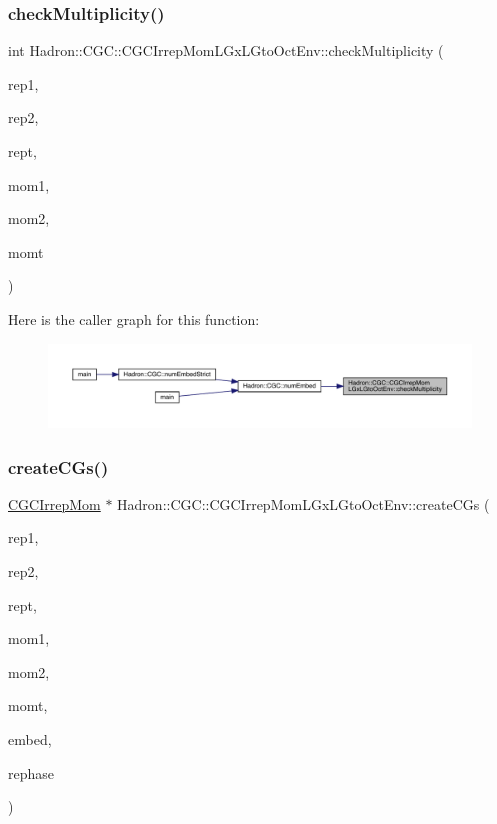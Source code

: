 \subsubsection{\texorpdfstring{checkMultiplicity()}{checkMultiplicity()}}
{\footnotesize\ttfamily int Hadron\+::\+C\+G\+C\+::\+C\+G\+C\+Irrep\+Mom\+L\+Gx\+L\+Gto\+Oct\+Env\+::check\+Multiplicity (\begin{DoxyParamCaption}\item[{const std\+::string \&}]{rep1,  }\item[{const std\+::string \&}]{rep2,  }\item[{const std\+::string \&}]{rept,  }\item[{const Array\+Int \&}]{mom1,  }\item[{const Array\+Int \&}]{mom2,  }\item[{const Array\+Int \&}]{momt }\end{DoxyParamCaption})}

Here is the caller graph for this function\+:\nopagebreak
\begin{figure}[H]
\begin{center}
\leavevmode
\includegraphics[width=350pt]{d1/d0f/namespaceHadron_1_1CGC_1_1CGCIrrepMomLGxLGtoOctEnv_aa39bf5f462bddb44a91da07a903947f4_icgraph}
\end{center}
\end{figure}
\mbox{\label{namespaceHadron_1_1CGC_1_1CGCIrrepMomLGxLGtoOctEnv_a326be3440106df05ce61c23e713f7312}} 
\subsubsection{\texorpdfstring{createCGs()}{createCGs()}}
{\footnotesize\ttfamily \mbox{\hyperlink{classHadron_1_1CGCIrrepMom}{C\+G\+C\+Irrep\+Mom}} $\ast$ Hadron\+::\+C\+G\+C\+::\+C\+G\+C\+Irrep\+Mom\+L\+Gx\+L\+Gto\+Oct\+Env\+::create\+C\+Gs (\begin{DoxyParamCaption}\item[{const std\+::string \&}]{rep1,  }\item[{const std\+::string \&}]{rep2,  }\item[{const std\+::string \&}]{rept,  }\item[{const Array\+Int \&}]{mom1,  }\item[{const Array\+Int \&}]{mom2,  }\item[{const Array\+Int \&}]{momt,  }\item[{int}]{embed,  }\item[{bool}]{rephase }\end{DoxyParamCaption})}

